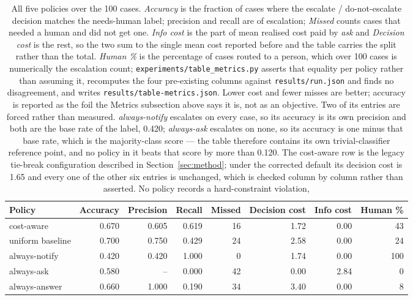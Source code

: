 \documentclass{article}
\begin{document}
\begin{table}[t]
\centering
\begin{tabular}{lrrrrrrr}
\toprule
Policy & Accuracy & Precision & Recall & Missed & Decision cost & Info cost
& Human \% \\
\midrule
cost-aware        & 0.670 & 0.605 & 0.619 & 16 & 1.72 & 0.00 & 43 \\
uniform baseline  & 0.700 & 0.750 & 0.429 & 24 & 2.58 & 0.00 & 24 \\
always-notify     & 0.420 & 0.420 & 1.000 & 0  & 1.74 & 0.00 & 100 \\
always-ask        & 0.580 & --    & 0.000 & 42 & 0.00 & 2.84 & 0 \\
always-answer     & 0.660 & 1.000 & 0.190 & 34 & 3.40 & 0.00 & 8 \\
\bottomrule
\end{tabular}
\caption{All five policies over the 100 cases. \emph{Accuracy} is the fraction of
cases where the escalate / do-not-escalate decision matches the needs-human label;
precision and recall are of escalation; \emph{Missed} counts cases that needed a
human and did not get one. \emph{Info cost} is the part of mean realised cost paid by
\emph{ask} and \emph{Decision cost} is the rest, so the two sum to the single mean
cost reported before and the table carries the split rather than the total.
\emph{Human \%} is the percentage of cases routed to a person, which over 100 cases
is numerically the escalation count; \texttt{experiments/table\_metrics.py} asserts
that equality per policy rather than assuming it, recomputes the four pre-existing
columns against \texttt{results/run.json} and finds no disagreement, and writes
\texttt{results/table-metrics.json}. Lower cost and fewer misses are better;
accuracy is reported as the foil the Metrics subsection above says it is, not as an
objective. Two of its entries are forced rather than measured. \emph{always-notify}
escalates on every case, so its accuracy is its own precision and both are the base
rate of the label, 0.420; \emph{always-ask} escalates on none, so its accuracy is one
minus that base rate, which is the majority-class score --- the table therefore
contains its own trivial-classifier reference point, and no policy in it beats that
score by more than 0.120. The cost-aware row is the legacy tie-break configuration
described in Section~\ref{sec:method}; under the corrected default its decision cost
is 1.65 and every one of the other six entries is unchanged, which is checked column
by column rather than asserted. No policy records a hard-constraint violation,
}
\end{table}
\end{document}
